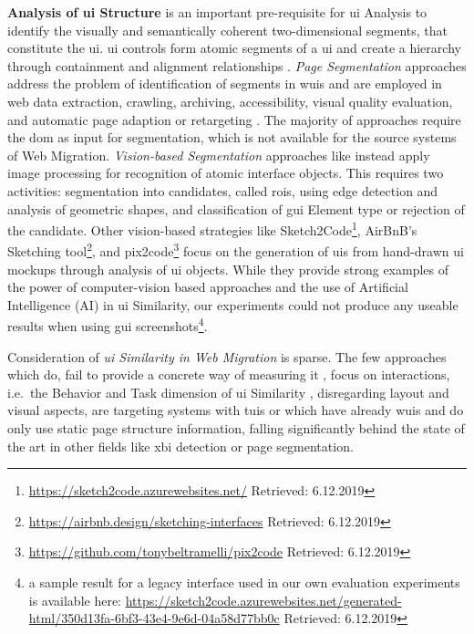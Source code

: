 \textbf{Analysis of \gls{ui} Structure} is an important pre-requisite for \gls{ui} Analysis to identify the visually and semantically coherent two-dimensional segments, that constitute the \gls{ui}.
\gls{ui} controls form atomic segments of a \gls{ui} and create a hierarchy through containment and alignment relationships \autocite{Choudhary2013XPERT}.
\emph{Page Segmentation} approaches address the problem of identification of segments in \glspl{wui} and are employed in \gls{web} data extraction, crawling, archiving, accessibility, visual quality evaluation, and automatic page adaption or retargeting \autocite{Sanoja2014,Talton2011Bricolage,Liu2010VIDE,Cai2003VIPS}.
The majority of approaches require the \gls{dom} as input for segmentation, which is not available for the \glspl{source system} of \gls{Web Migration}.
\emph{Vision-based Segmentation} approaches like \autocite{Kong2012} instead apply image processing for recognition of atomic interface objects.
This requires two activities: segmentation into candidates, called \glspl{roi}, using edge detection and analysis of geometric shapes, and classification of \gls{gui} Element type or rejection of the candidate.
Other vision-based strategies like Sketch2Code\footnote{\url{https://sketch2code.azurewebsites.net/} Retrieved: 6.12.2019}, AirBnB's Sketching tool\footnote{\url{https://airbnb.design/sketching-interfaces} Retrieved: 6.12.2019}, and pix2code\footnote{\url{https://github.com/tonybeltramelli/pix2code} Retrieved: 6.12.2019} focus on the generation of \glspl{ui} from hand-drawn \gls{ui} mockups through analysis of \gls{ui} objects.
While they provide strong examples of the power of computer-vision based approaches and the use of Artificial Intelligence (AI) in \gls{ui} Similarity, our experiments could not produce any useable results when using  \gls{gui} screenshots\footnote{a sample result for a legacy interface used in our own evaluation experiments \autocite{Heil2016Similarity} is available here: \url{https://sketch2code.azurewebsites.net/generated-html/350d13fa-6bf3-43e4-9e6d-04a58d77bb0c} Retrieved: 6.12.2019}.

Consideration of \emph{\gls{ui} Similarity in \gls{Web Migration}} is sparse.
The few approaches which do, fail to provide a concrete way of measuring it \autocite{Remics2013RecoverToolkit,Rodriguez-Echeverria2012MIGRARIA,Lucia2008,Distante2006a}, focus on interactions, i.e.~the Behavior and Task dimension of \gls{ui} Similarity \autocite{Cajas2019}, disregarding layout and visual aspects, are targeting  systems with \glspl{tui} \autocite{Stroulia2003,Bodhuin2002DesktopWebMVC} or which have already \glspl{wui} \autocite{Lucia2007SimilarPages} and do only use static page structure information, falling significantly behind the state of the art in other fields like \gls{xbi} detection or page segmentation.

